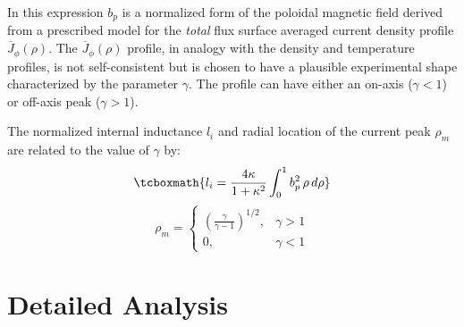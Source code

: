 In this expression $b_p$ is a normalized form of the poloidal magnetic field derived from a prescribed model for the \emph{total} flux surface averaged current density profile $\overline J_\phi(\rho)$. The $\overline J_\phi(\rho)$ profile, in analogy with the density and temperature profiles, is not self-consistent but is chosen to have a plausible experimental shape characterized by the parameter $\gamma$. The profile can have either an on-axis ($\gamma < 1$) or off-axis peak ($\gamma > 1 $).

The normalized internal inductance $l_i$ and radial location of the current peak $\rho_m$ are related to the value of $\gamma$ by:
\begin{equation}
	\label{eq:l_i}
	\tcboxmath{
	l_i = \frac{ 4 \kappa }{ 1 + \kappa^2 } \int_0^1 b_p^2 \, \rho \, d\rho
	}
\end{equation}
\begin{equation}
	\rho_m = 
\begin{cases}
   \left( \frac{\gamma}{\gamma - 1} \right)^{1/2},& \gamma > 1 \\
    0,              & \gamma < 1
\end{cases}
\end{equation}

\section{Detailed Analysis}

